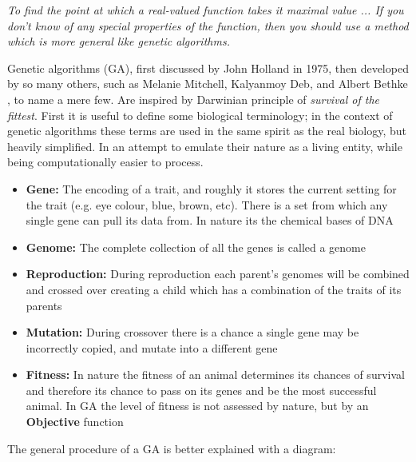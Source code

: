 \documentclass[11pt]{article}
\begin{document}
    \begin{displayquote} \textit {
        To find the point at which a real-valued function takes it maximal value ...
        If you don't know of any special properties of the function, then you
        should use a method which is more general like genetic algorithms.
    } \end{displayquote}

    Genetic algorithms (GA), first 
    discussed by John Holland \cite{Holland} in 1975, then developed by so many
    others, such as Melanie Mitchell, Kalyanmoy Deb, and Albert Bethke
    \cite{Mitchell, KalyanmoyDeb, Bethke}, to name a mere few. Are inspired by Darwinian
    principle of \textit{survival of the fittest}.
    First it is useful to define some biological terminology; in the context of
    genetic algorithms these terms are used in the same spirit as the real biology,
    but heavily simplified. In an attempt to emulate their nature as a living entity,
    while being computationally easier to process.

    \begin{itemize}
        \item{\textbf{Gene:} The encoding of a trait, and roughly it stores the current
            setting for the trait (e.g. eye colour, blue, brown, etc). There is a set
            from which any single gene can pull its data from. In nature its the chemical
            bases  of DNA}
        \item{\textbf{Genome:} The complete collection of all the genes is called a
            genome}
        \item{\textbf{Reproduction:} During reproduction each parent's genomes will be
            combined and crossed over creating a child which has a combination of
            the traits of its parents}
        \item{\textbf{Mutation:} During crossover there is a chance a single gene
            may be incorrectly copied, and mutate into a different gene}
        \item{\textbf{Fitness: } In nature the fitness of an animal determines
            its chances of survival and therefore its chance to pass on its genes
            and be the most successful animal. In GA the level of fitness is not assessed
            by nature, but by an \textbf{Objective} function}
    \end{itemize}

    The general procedure of a GA is better explained with a diagram:
\end{document}
